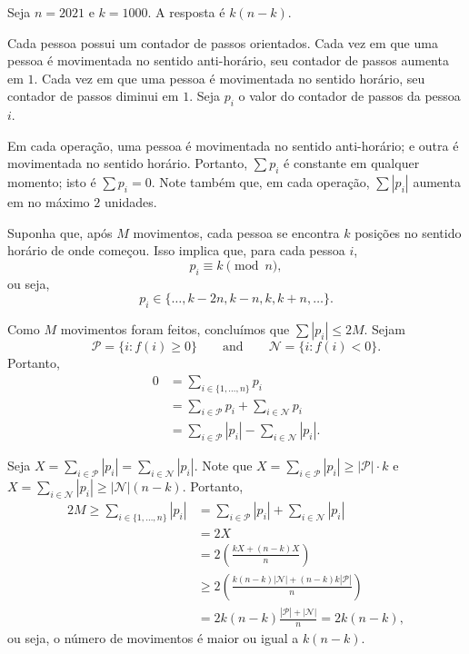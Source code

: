 \documentclass[10pt,a4paper]{scrartcl}
\begin{document}
	\begin{sol}
		Seja \(n = 2021\) e \(k = 1000\). A resposta é \(k(n-k)\).

		Cada pessoa possui um contador de passos orientados.
		Cada vez em que uma pessoa é movimentada no sentido anti-horário, seu contador de passos aumenta em \(1\).
		Cada vez em que uma pessoa é movimentada no sentido horário, seu contador de passos diminui em \(1\).
		Seja \(p_i\) o valor do contador de passos da pessoa \(i\).

		Em cada operação, uma pessoa é movimentada no sentido anti-horário; e outra é movimentada no sentido horário.
		Portanto, \(\sum p_i\) é constante em qualquer momento; isto é \(\sum p_i = 0\).
		Note também que, em cada operação, \(\sum |p_i|\) aumenta em no máximo  \(2\) unidades.

		Suponha que, após \(M\) movimentos, cada pessoa se encontra \(k\) posições no sentido horário de onde começou.
		Isso implica que, para cada pessoa \(i\), \[
			p_i \equiv k \pmod{n},
		\] ou seja, \[
			p_i \in \{\dots, k-2n, k-n, k, k+n, \dots \}.
		\]

		Como \(M\) movimentos foram feitos, concluímos que \(\sum |p_i| \leq 2M\).
		Sejam \[ \mathcal P = \{i : f(i) \geq 0\} \qquad \text{and} \qquad \mathcal N = \{i : f(i) < 0\}.  \]
		Portanto,
		\begin{align*}
			0 &= \sum_{i \in \{1, \dots, n\}} p_i \\
			  &= \sum_{i \in \mathcal P} p_i   + \sum_{i \in \mathcal N} p_i   \\
			  &= \sum_{i \in \mathcal P} |p_i| - \sum_{i \in \mathcal N} |p_i|.
		\end{align*}

		Seja \(X = \sum_{i \in \mathcal P} |p_i| = \sum_{i \in \mathcal N} |p_i|\).
		Note que \(X = \sum_{i \in \mathcal P} |p_i| \geq |\mathcal P| \cdot k\) e \(X = \sum_{i \in \mathcal N} |p_i| \geq |\mathcal N| (n-k)\).
		Portanto,
		\begin{align*}
		2M \geq	\sum_{i \in \{1, \dots, n\}} |p_i|
			&= \sum_{i \in \mathcal P} |p_i| + \sum_{i \in \mathcal N} |p_i| \\
			&= 2X \\
			&= 2\left(\frac{kX + (n-k)X}{n}\right) \\
			&\geq 2\left(\frac{k(n-k)|\mathcal N| + (n-k)k|\mathcal P|}{n}\right) \\
			&= 2k(n-k)\frac{|\mathcal P| + |\mathcal N|}{n} = 2k(n-k),
		\end{align*}
		ou seja, o número de movimentos é maior ou igual a \(k(n-k)\).


\end{sol}
\end{document}
